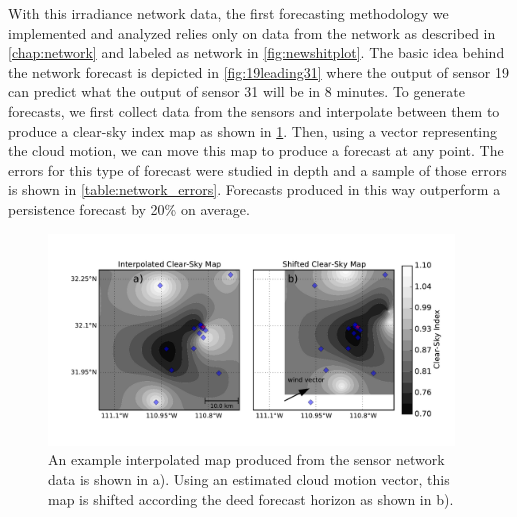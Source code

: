 With this irradiance network data, the first forecasting methodology
we implemented and analyzed relies only on data from the network as
described in \cref{chap:network} and labeled as network in
\cref{fig:newshitplot}.
The basic idea behind the network forecast is depicted in
\cref{fig:19leading31} where the output of sensor 19 can predict what
the output of sensor 31 will be in 8 minutes.
To generate forecasts, we first collect data from the sensors and
interpolate between them to produce a clear-sky index map as shown in
\cref{fig:clearmap}.
Then, using a vector representing the cloud motion, we can move this
map to produce a forecast at any point.
The errors for this type of forecast were studied in depth and a
sample of those errors is shown in \cref{table:network_errors}.
Forecasts produced in this way outperform a persistence forecast by
20\% on average.

\begin{figure}[hbtp]
\centering
\includegraphics[width=0.96\textwidth]{figs/clearmap.pdf}
\caption[Illustration of the network forecast methodology]{An example
  interpolated map produced from the sensor network data is shown in
  a). Using an estimated cloud motion vector, this map is shifted
  according the deed forecast horizon as shown in b).}
\label{fig:clearmap}
\end{figure}

